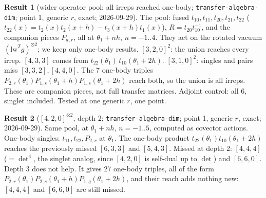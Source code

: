 \documentclass[11pt]{article}
\newcommand{\nb}[1]{\texttt{#1}}
\theoremstyle{definition}
\newtheorem{result}{Result}
\theoremstyle{remark}
\begin{document}
\begin{result}[{wider operator pool: all irreps reached one-body; \nb{transfer-algebra-dim}; point 1, generic $r$, exact; 2026-09-29}]
The pool: fused $t_{10},t_{11},t_{20},t_{21},t_{22}$ ($t_{22}(x)=t_2(x)t_2(x+h)-t_3(x+h)t_1(x)$), $R=t_{20}t_{10}^{-1}$, and the companion pieces $P_{a,r}$, all at $\theta_1+nh$, $n=-1..4$. They act on the rotated vacuum $(\mathrm{lw}^Tg)^{\otimes2}$; we keep only one-body results.
$[3,2,0]^2$: the union reaches every irrep. $[4,3,3]$ comes from $t_{22}(\theta_1)\,t_{10}(\theta_1+2h)$.
$[3,1,0]^2$: singles and pairs miss $[3,3,2],[4,4,0]$. The 7 one-body triples $P_{2,r}(\theta_1)P_{1,s}(\theta_1+h)P_{1,s}(\theta_1+2h)$ reach both, so the union is all irreps. These are companion pieces, not full transfer matrices.
Adjoint control: all 6, singlet included. Tested at one generic $r$, one point.
\end{result}

\begin{result}[{$[4,2,0]^{\otimes2}$, depth 2; \nb{transfer-algebra-dim}; point 1, generic $r$, exact; 2026-09-29}]
Same pool, at $\theta_1+nh$, $n=-1..5$, computed as covector actions. One-body singles: $t_{11},t_{22},P_{2,r}$ at $\theta_1$. The one-body product $t_{22}(\theta_1)t_{10}(\theta_1+2h)$ reaches the previously missed $[6,3,3]$ and $[5,4,3]$.
Missed at depth 2: $[4,4,4]$ ($=\det^4$, the singlet analog, since $[4,2,0]$ is self-dual up to $\det$) and $[6,6,0]$.
Depth 3 does not help. It gives 27 one-body triples, all of the form $P_{2,r}(\theta_1)P_{2,s}(\theta_1+h)P_{1,q}(\theta_1+2h)$, and their reach adds nothing new: $[4,4,4]$ and $[6,6,0]$ are still missed.
\end{result}

\end{document}
